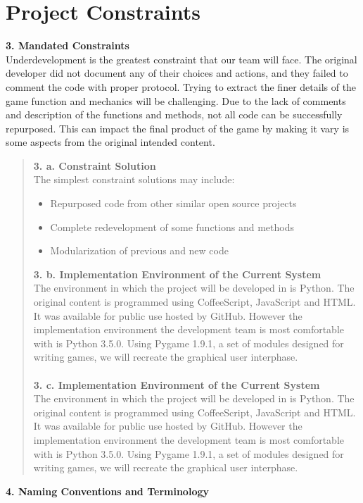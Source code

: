 \documentclass[12pt]{article}
\begin{document}
\section*{Project Constraints}
\textbf{3. Mandated Constraints}\\
Underdevelopment is the greatest constraint that our team will face. The original developer did not document any of their choices and actions, and they failed to comment the code with proper protocol. Trying to extract the finer details of the game function and mechanics will be challenging. Due to the lack of comments and description of the functions and methods, not all code can be successfully repurposed. This can impact the final product of the game by making it vary is some aspects from the original intended content.

\begin{quote}
 \textbf{3. a. Constraint Solution}\\
 The simplest constraint solutions may include:
 \begin{itemize}
  \item Repurposed code from other similar open source projects
  \item Complete redevelopment of some functions and methods
  \item Modularization of previous and new code
 \end{itemize}
 \textbf{3. b. Implementation Environment of the Current System}\\
 The environment in which the project will be developed in is Python. The original content is programmed using CoffeeScript, JavaScript and HTML. It was available for public use hosted by GitHub. However the implementation environment the development team is most comfortable with is Python 3.5.0. Using Pygame 1.9.1, a set of modules designed for writing games, we will recreate the graphical user interphase.\\\\
 \textbf{3. c. Implementation Environment of the Current System}\\
 The environment in which the project will be developed in is Python. The original content is programmed using CoffeeScript, JavaScript and HTML. It was available for public use hosted by GitHub. However the implementation environment the development team is most comfortable with is Python 3.5.0. Using Pygame 1.9.1, a set of modules designed for writing games, we will recreate the graphical user interphase.
\end{quote}
\textbf{4. Naming Conventions and Terminology}\\
\end{document}
